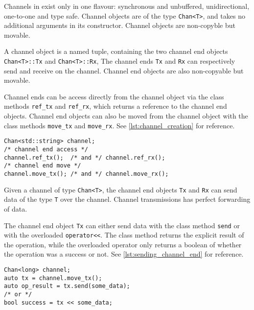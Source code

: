 Channels in \Proxc{} exist only in one flavour: synchronous and unbuffered, unidirectional, one\hyp{}to\hyp{}one and type safe. Channel objects are of the type \lstinline[style={CustomC++}]|Chan<T>|, and takes no additional arguments in its constructor. Channel objects are non\hyp{}copyble but movable.

A channel object is a named tuple, containing the two channel end objects \lstinline[style={CustomC++}]|Chan<T>::Tx| and \lstinline[style={CustomC++}]|Chan<T>::Rx|, The channel ends \lstinline[style={CustomC++}]|Tx| and \lstinline[style={CustomC++}]|Rx| can respectively send and receive on the channel. Channel end objects are also non\hyp{}copyable but movable.

Channel ends can be access directly from the channel object via the class methods \lstinline[style={CustomC++}]|ref_tx| and \lstinline[style={CustomC++}]|ref_rx|, which returns a reference to the channel end objects. Channel end objects can also be moved from the channel object with the class methods \lstinline[style={CustomC++}]|move_tx| and \lstinline[style={CustomC++}]|move_rx|. See \cref{lst:channel_creation} for reference.

\begin{lstfloat}
\begin{lstlisting}[caption={Channel creation and channel end access.}, label={lst:channel_creation}, style={CustomC++}, xleftmargin={2em}]
Chan<std::string> channel;
/* channel end access */
channel.ref_tx();  /* and */ channel.ref_rx();
/* channel end move */
channel.move_tx(); /* and */ channel.move_rx();
\end{lstlisting}
\end{lstfloat}

Given a channel of type \lstinline[style={CustomC++}]|Chan<T>|, the channel end objects \lstinline[style={CustomC++}]|Tx| and \lstinline[style={CustomC++}]|Rx| can send data of the type \lstinline[style={CustomC++}]|T| over the channel. Channel transmissions has perfect forwarding of data.

The channel end object \lstinline[style={CustomC++}]|Tx| can either send data with the class method \lstinline[style={CustomC++}]|send| or with the overloaded \lstinline[style={CustomC++}]|operator<<|. The class method returns the explicit result of the operation, while the overloaded operator only returns a boolean of whether the operation was a success or not. See \cref{lst:sending_channel_end} for reference.

\begin{lstfloat}
\begin{lstlisting}[caption={Sending on the Tx channel end object.}, label={lst:sending_channel_end}, style={CustomC++}, xleftmargin={2em}]
Chan<long> channel;
auto tx = channel.move_tx();
auto op_result = tx.send(some_data); 
/* or */
bool success = tx << some_data;
\end{lstlisting}
\end{lstfloat}


